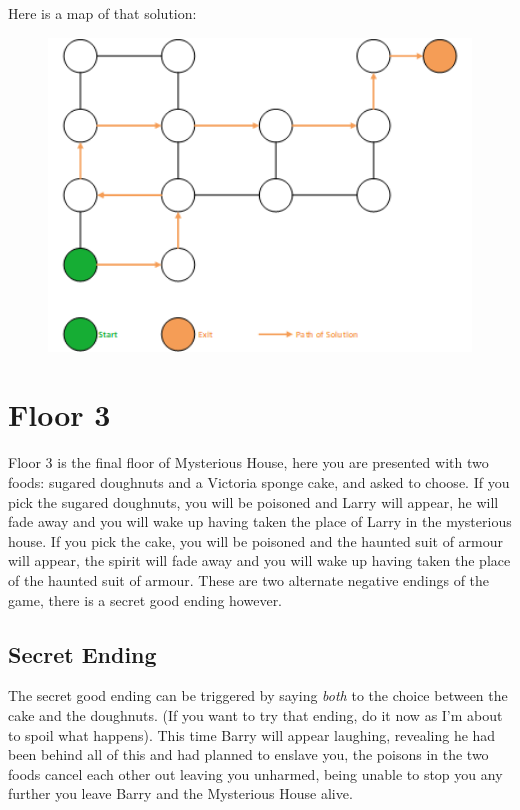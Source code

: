 \documentclass{article}
\begin{document}
\newpage
Here is a map of that solution:

\begin{figure}[htb]
	\centering
	\includegraphics[width=4.5in]{Floor2-Solution.png}
\end{figure}

\section*{Floor 3}
Floor 3 is the final floor of Mysterious House, here you are presented with two foods: sugared doughnuts and a Victoria sponge cake, and asked to choose.
If you pick the sugared doughnuts, you will be poisoned and Larry will appear, he will fade away and you will wake up having taken the place of Larry in the mysterious house.
If you pick the cake, you will be poisoned and the haunted suit of armour will appear, the spirit will fade away and you will wake up having taken the place of the haunted suit of armour.
These are two alternate negative endings of the game, there is a secret good ending however.

\subsection*{Secret Ending}
The secret good ending can be triggered by saying \textit{both} to the choice between the cake and the doughnuts.
(If you want to try that ending, do it now as I'm about to spoil what happens).
This time Barry will appear laughing, revealing he had been behind all of this and had planned to enslave you, the poisons in the two foods cancel each other out leaving you unharmed, being unable to stop you any further you leave Barry and the Mysterious House alive.
\end{document}
